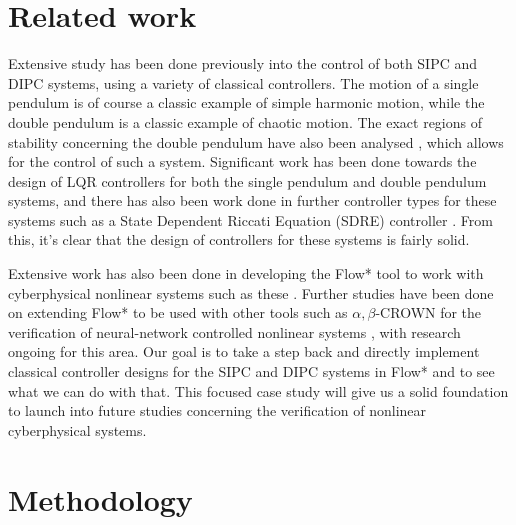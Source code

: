 \documentclass{article}
\theoremstyle{plain}
\theoremstyle{definition}
\theoremstyle{remark}
\begin{document}
\section{Related work}
\label{sec:related}
Extensive study has been done previously into the control of both SIPC and DIPC systems, using a variety of classical controllers. The motion of a single pendulum is of course a classic example of simple harmonic motion, while the double pendulum is a classic example of chaotic motion. The exact regions of stability concerning the double pendulum have also been analysed \cite{DPMotion}, which allows for the control of such a system. Significant work has been done towards the design of LQR controllers for both the single pendulum \cite{BruntonSIPC} and double pendulum \cite{DIPCLong, DIPCShort} systems, and there has also been work done in further controller types for these systems such as a State Dependent Riccati Equation (SDRE) controller \cite{DIPCShort}. From this, it’s clear that the design of controllers for these systems is fairly solid.

Extensive work has also been done in developing the Flow* tool to work with cyberphysical nonlinear systems such as these \cite{FlowStar}. Further studies have been done on extending Flow* to be used with other tools such as $\alpha,\beta$-CROWN for the verification of neural-network controlled nonlinear systems \cite{ARCH_COMP}, with research ongoing for this area. Our goal is to take a step back and directly implement classical controller designs for the SIPC and DIPC systems in Flow* and to see what we can do with that. This focused case study will give us a solid foundation to launch into future studies concerning the verification of nonlinear cyberphysical systems.


\section{Methodology}
\label{sec:method}
\end{document}
